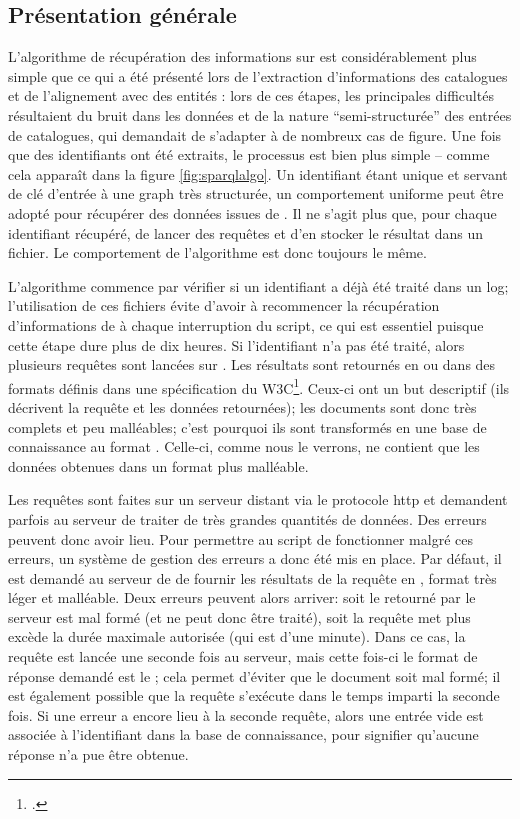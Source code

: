 \subsection{Présentation générale}
L'algorithme de récupération des informations sur \wkd{} est considérablement plus simple que ce qui a été présenté lors de l'extraction d'informations des catalogues et de l'alignement avec des entités \wkd{}: lors de ces étapes, les principales difficultés résultaient du bruit dans les données et de la nature \enquote{semi-structurée} des entrées de catalogues, qui demandait de s'adapter à de nombreux cas de figure. Une fois que des identifiants \wkd{} ont été extraits, le processus est bien plus simple -- comme cela apparaît dans la figure \ref{fig:sparqlalgo}. Un identifiant étant unique et servant de clé d'entrée à une \gls{graph} très structurée, un comportement uniforme peut être adopté pour récupérer des données issues de \wkd{}. Il ne s'agit plus que, pour chaque identifiant \wkd{} récupéré, de lancer des requêtes \sparql{} et d'en stocker le résultat dans un fichier. Le comportement de l'algorithme est donc toujours le même.

L'algorithme commence par vérifier si un identifiant a déjà été traité dans un \gls{log}; l'utilisation de ces fichiers évite d'avoir à recommencer la récupération d'informations de \wkd{} à chaque interruption du script, ce qui est essentiel puisque cette étape dure plus de dix heures. Si l'identifiant n'a pas été traité, alors plusieurs requêtes \sparql{} sont lancées sur \wkd{}. Les résultats sont retournés en \json{} ou \xml dans des formats définis dans une spécification du W3C\footcite{beckett_sparql_2013}. Ceux-ci ont un but descriptif (ils décrivent la requête et les données retournées); les documents \sparql{} sont donc très complets et peu malléables; c'est pourquoi ils sont transformés en une base de connaissance au format \json{}. Celle-ci, comme nous le verrons, ne contient que les données obtenues dans un format plus malléable.

Les requêtes \sparql{} sont faites sur un serveur distant via le protocole \gls{http} et demandent parfois au serveur de traiter de très grandes quantités de données. Des erreurs peuvent donc avoir lieu. Pour permettre au script de fonctionner malgré ces erreurs, un système de gestion des erreurs a donc été mis en place. Par défaut, il est demandé au serveur de \wkd{} de fournir les résultats de la requête en \json{}, format très léger et malléable. Deux erreurs peuvent alors arriver: soit le \json{} retourné par le serveur est mal formé (et ne peut donc être traité), soit la requête met plus excède la durée maximale autorisée (qui est d'une minute). Dans ce cas, la requête est lancée une seconde fois au serveur, mais cette fois-ci le format de réponse demandé est le \xml{}; cela permet d'éviter que le document soit mal formé; il est également possible que la requête s'exécute dans le temps imparti la seconde fois. Si une erreur a encore lieu à la seconde requête, alors une entrée vide est associée à l'identifiant \wkd{} dans la base de connaissance, pour signifier qu'aucune réponse n'a pue être obtenue.

